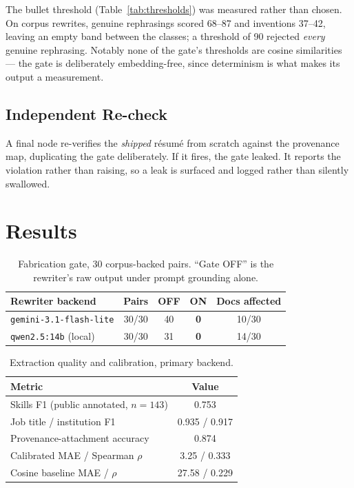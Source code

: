 \documentclass[conference]{IEEEtran}
\begin{document}
The bullet threshold (Table~\ref{tab:thresholds}) was measured rather than
chosen. On corpus rewrites, genuine rephrasings scored 68--87 and inventions
37--42, leaving an empty band between the classes; a threshold of 90 rejected
\emph{every} genuine rephrasing. Notably none of the gate's thresholds are
cosine similarities --- the gate is deliberately embedding-free, since
determinism is what makes its output a measurement.

\subsection{Independent Re-check}

A final node re-verifies the \emph{shipped} résumé from scratch against the
provenance map, duplicating the gate deliberately. If it fires, the gate leaked.
It reports the violation rather than raising, so a leak is surfaced and logged
rather than silently swallowed.

\section{Results}
\label{sec:results}

\begin{table}[t]
\centering
\caption{Fabrication gate, 30 corpus-backed pairs. ``Gate OFF'' is the
rewriter's raw output under prompt grounding alone.}
\label{tab:gate}
\begin{tabular}{@{}lcccc@{}}
\toprule
Rewriter backend & Pairs & OFF & ON & Docs affected \\
\midrule
\texttt{gemini-3.1-flash-lite} & 30/30 & 40 & \textbf{0} & 10/30 \\
\texttt{qwen2.5:14b} (local)   & 30/30 & 31 & \textbf{0} & 14/30 \\
\bottomrule
\end{tabular}
\end{table}

\begin{table}[t]
\centering
\caption{Extraction quality and calibration, primary backend.}
\label{tab:quality}
\begin{tabular}{@{}lc@{}}
\toprule
Metric & Value \\
\midrule
Skills F1 (public annotated, $n{=}143$) & 0.753 \\
Job title / institution F1 & 0.935 / 0.917 \\
Provenance-attachment accuracy & 0.874 \\
Calibrated MAE / Spearman $\rho$ & 3.25 / 0.333 \\
Cosine baseline MAE / $\rho$ & 27.58 / 0.229 \\
\bottomrule
\end{tabular}
\end{table}
\end{document}
